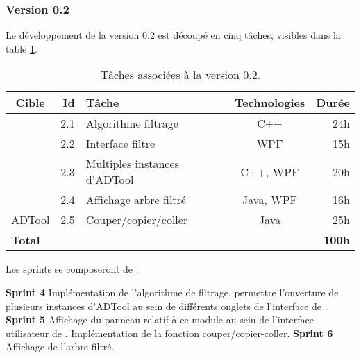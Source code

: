 	\subsubsection{Version 0.2}
		Le développement de la version 0.2 est découpé en cinq tâches, visibles dans la {\sc table} \ref{tab:taches_units_2}.
		\begin{table}[h]
			\centering
			\begin{tabular}{|c|r|l|c|r|}
				\hline
				\textbf{Cible} & \textbf{Id} & \textbf{Tâche} & \textbf{Technologies} & \textbf{Durée}\\
				\hline

				\multirow{4}{*}{\glasir{}} & 2.1 & Algorithme filtrage & C++ & 24h\\
				\cline{2-5}
				 & 2.2 & Interface filtre & WPF & 15h\\
				\cline{2-5}
				 & 2.3 & Multiples instances d'ADTool & C++, WPF & 20h\\
				\cline{2-5}
				 & 2.4 & Affichage arbre filtré & Java, WPF & 16h\\
				\hline

				\multirow{1}{*}{ADTool} & 2.5 & Couper/copier/coller & \multirow{1}{*}{Java} & 25h\\
				\hline

				\multicolumn{4}{|l|}{\bf Total} & {\bf 100h}\\
				\hline
			\end{tabular}
			\caption{Tâches associées à la version 0.2.}
			\label{tab:taches_units_2}
		\end{table}
		
		Les sprints se composeront de :
		
		\textbf{Sprint 4} Implémentation de l'algorithme de filtrage, permettre l'ouverture de plusieurs instances d'ADTool au sein de différents onglets de l'interface de \glasir{}.\newline 
		\textbf{Sprint 5} Affichage du panneau relatif à ce module au sein de l'interface utilisateur de \glasir{}. Implémentation de la fonction couper/copier-coller.\newline %
		\textbf{Sprint 6} Affichage de l'arbre filtré.

